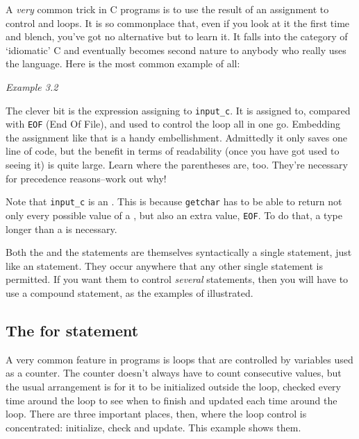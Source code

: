     A \textit{very} common trick in C programs is to use the result of
     an assignment to control \while{} and \kdo{} loops. It
     is so commonplace that, even if you look at it the first time and blench,
     you've got no alternative but to learn it. It falls into the category of
     `idiomatic' C and eventually becomes second nature to anybody who
     really uses the language. Here is the most common example of all:


    \begin{center}\textit{Example 3.2}\end{center}


    The clever bit is the expression assigning to \texttt{input\_c}. It
     is assigned to, compared with \texttt{EOF} (End Of File), and used to
     control the loop all in one go. Embedding the assignment like that is a
     handy embellishment. Admittedly it only saves one line of code, but the
     benefit in terms of readability (once you have got used to seeing it) is
     quite large. Learn where the parentheses are, too. They're necessary for
     precedence reasons--work out why!


    Note that \texttt{input\_c} is an \kint. This is because
     \texttt{getchar} has to be able to return not only every possible
     value of a \kchar, but also an extra value, \texttt{EOF}.
     To do that, a type longer than a \kchar{} is necessary.


    Both the \while{} and the \kdo{} statements are
     themselves syntactically a single statement, just like an \kif{}
     statement. They occur anywhere that any other single statement is
     permitted. If you want them to control \textit{several} statements, then
     you will have to use a compound statement, as the examples of
     \kif{} illustrated.


   

  

  \subsection{The for statement}
   

   A very common feature in programs is loops that are controlled by
    variables used as a counter. The counter doesn't always have to count
    consecutive values, but the usual arrangement is for it to be initialized
    outside the loop, checked every time around the loop to see when to finish
    and updated each time around the loop. There are three important places,
    then, where the loop control is concentrated: initialize, check and
    update. This example shows them.


